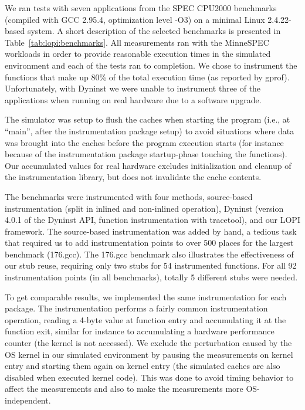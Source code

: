
We ran tests with seven applications from the SPEC CPU2000 benchmarks
(compiled with GCC 2.95.4, optimization level -O3) on a minimal Linux
2.4.22-based system.  A short description of the selected benchmarks is
presented in Table~\ref{tab:lopi:benchmarks}.  All measurements ran with the
MinneSPEC~\cite{minnespec} workloads in order to provide reasonable execution
times in the simulated environment and each of the tests ran to completion.
We chose to instrument the functions that make up 80\% of the total execution
time (as reported by gprof). Unfortunately, with Dyninst we were unable to
instrument three of the applications when running on real hardware due to a
software upgrade.

The simulator was setup to flush the caches when starting the program (i.e.,
at ``main'', after the instrumentation package setup) to avoid situations
where data was brought into the caches before the program execution starts
(for instance because of the instrumentation package startup-phase touching
the functions).  Our accumulated values for real hardware excludes
initialization and cleanup of the instrumentation library, but does not
invalidate the cache contents.

The benchmarks were instrumented with four methods, source-based
instrumentation (split in inlined and non-inlined operation), Dyninst (version
4.0.1 of the Dyninst API, function instrumentation with tracetool), and our
LOPI framework. The source-based instrumentation was added by hand, a tedious
task that required us to add instrumentation points to over 500 places for
the largest benchmark (176.gcc). The 176.gcc benchmark also illustrates the
effectiveness of our stub reuse, requiring only two stubs for 54 instrumented
functions. For all 92 instrumentation points (in all benchmarks), totally 5
different stubs were needed.

To get comparable results, we implemented the same instrumentation for each
package. The instrumentation performs a fairly common instrumentation
operation, reading a 4-byte value at function entry and accumulating it at the
function exit, similar for instance to accumulating a hardware performance
counter (the kernel is not accessed). We exclude the perturbation caused by
the OS kernel in our simulated environment by pausing the measurements on
kernel entry and starting them again on kernel entry (the simulated caches are
also disabled when executed kernel code). This was done to avoid timing
behavior to affect the measurements and also to make the measurements more
OS-independent.


